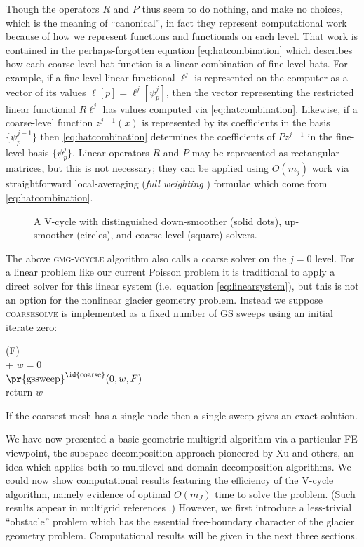 \documentclass[letterpaper,final,12pt,reqno]{amsart}
\theoremstyle{claim}
\numberwithin{equation}{section}
\numberwithin{figure}{section}
\numberwithin{table}{section}
\begin{document}
Though the operators $R$ and $P$ thus seem to do nothing, and make no choices, which is the meaning of ``canonical'', in fact they represent computational work because of how we represent functions and functionals on each level.  That work is contained in the perhaps-forgotten equation \eqref{eq:hatcombination} which describes how each coarse-level hat function is a linear combination of fine-level hats.  For example, if a fine-level linear functional $\ell^j$ is represented on the computer as a vector of its values $\ell[p] = \ell^j[\psi_p^j]$, then the vector representing the restricted linear functional $R \ell^j$ has values computed via \eqref{eq:hatcombination}.  Likewise, if a coarse-level function $z^{j-1}(x)$ is represented by its coefficients in the basis $\{\psi_p^{j-1}\}$ then \eqref{eq:hatcombination} determines the coefficients of $P z^{j-1}$ in the fine-level basis $\{\psi_p^j\}$.  Linear operators $R$ and $P$ may be represented as rectangular matrices, but this is not necessary; they can be applied using $O(m_j)$ work via straightforward local-averaging (\emph{full weighting} \cite{Briggsetal2000}) formulae which come from \eqref{eq:hatcombination}.

\begin{figure}

\caption{A V-cycle with distinguished down-smoother (solid dots), up-smoother (circles), and coarse-level (square) solvers.}
\label{fig:vcycle}
\end{figure}

The above \textsc{gmg-vcycle} algorithm also calls a coarse solver on the $j=0$ level.  For a linear problem like our current Poisson problem it is traditional to apply a direct solver for this linear system (i.e.~equation \eqref{eq:linearsystem}), but this is not an option for the nonlinear glacier geometry problem.  Instead we suppose \textsc{coarsesolve} is implemented as a fixed number of GS sweeps using an initial iterate zero:
\begin{pseudo*}
(F)\text{:} \\+
    $w=0$ \\
    $\text{\pr{gssweep}}^{\text{\id{coarse}}}(0,w,F)$ \\
    return $w$
\end{pseudo*}
If the coarsest mesh has a single node then a single sweep gives an exact solution.

We have now presented a basic geometric multigrid algorithm via a particular FE viewpoint, the subspace decomposition approach pioneered by Xu \cite{Xu1992} and others, an idea which applies both to multilevel and domain-decomposition algorithms.  We could now show computational results featuring the efficiency of the V-cycle algorithm, namely evidence of optimal $O(m_J)$ time to solve the problem.  (Such results appear in multigrid references \cite{Briggsetal2000,Bueler2021,Elmanetal2014,Trottenbergetal2001}.)  However, we first introduce a less-trivial ``obstacle'' problem which has the essential free-boundary character of the glacier geometry problem.  Computational results will be given in the next three sections.
\end{document}
